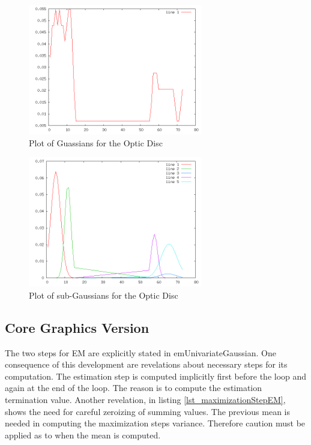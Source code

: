 \documentclass[11pt]{article}
\begin{document}
\begin{figure}[htbp] %
   \centering
   \includegraphics[width=3in]{plot.png} 
   \caption{Plot of Guassians for the Optic Disc}
   \label{histogram-optic-disc}
\end{figure}


\begin{figure}[htbp] %
   \centering
   \includegraphics[width=3in]{probability.png} 
   \caption{Plot of sub-Gaussians for the Optic Disc}
   \label{histograms-optic-disc}
\end{figure}

\subsection{Core Graphics Version}
The two steps for EM are explicitly stated in emUnivariateGaussian.  One consequence of this development are revelations about necessary steps for its computation.    The estimation step is computed implicitly first before the loop and again at the end of the loop.  The reason is to compute the estimation termination value.    Another revelation, in listing \ref{lst_maximizationStepEM}, shows the need for careful zeroizing of summing values.  The previous mean is needed in computing the maximization steps variance.    Therefore caution must be applied as to when the mean is computed.  
\end{document}
